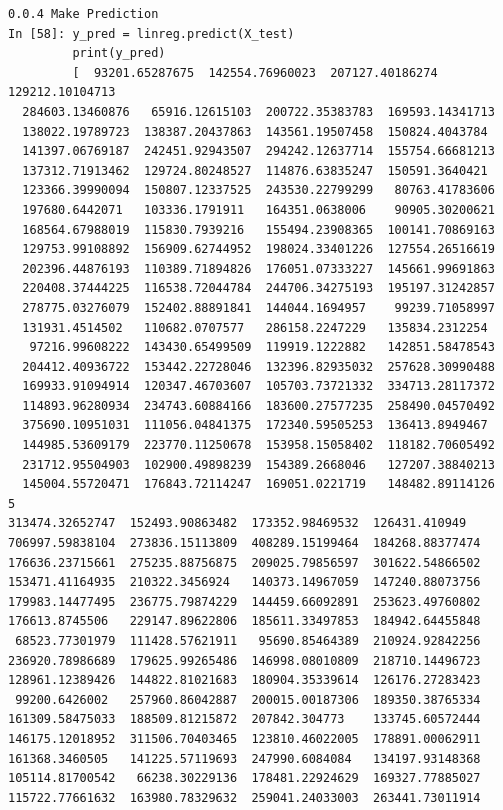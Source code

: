 \documentclass[sigconf]{acmart}
\begin{document}
\begin{lstlisting}
0.0.4 Make Prediction
In [58]: y_pred = linreg.predict(X_test)
         print(y_pred)
         [  93201.65287675  142554.76960023  207127.40186274  129212.10104713
  284603.13460876   65916.12615103  200722.35383783  169593.14341713
  138022.19789723  138387.20437863  143561.19507458  150824.4043784
  141397.06769187  242451.92943507  294242.12637714  155754.66681213
  137312.71913462  129724.80248527  114876.63835247  150591.3640421
  123366.39990094  150807.12337525  243530.22799299   80763.41783606
  197680.6442071   103336.1791911   164351.0638006    90905.30200621
  168564.67988019  115830.7939216   155494.23908365  100141.70869163
  129753.99108892  156909.62744952  198024.33401226  127554.26516619
  202396.44876193  110389.71894826  176051.07333227  145661.99691863
  220408.37444225  116538.72044784  244706.34275193  195197.31242857
  278775.03276079  152402.88891841  144044.1694957    99239.71058997
  131931.4514502   110682.0707577   286158.2247229   135834.2312254
   97216.99608222  143430.65499509  119919.1222882   142851.58478543
  204412.40936722  153442.22728046  132396.82935032  257628.30990488
  169933.91094914  120347.46703607  105703.73721332  334713.28117372
  114893.96280934  234743.60884166  183600.27577235  258490.04570492
  375690.10951031  111056.04841375  172340.59505253  136413.8949467
  144985.53609179  223770.11250678  153958.15058402  118182.70605492
  231712.95504903  102900.49898239  154389.2668046   127207.38840213
  145004.55720471  176843.72114247  169051.0221719   148482.89114126
5
313474.32652747  152493.90863482  173352.98469532  126431.410949
706997.59838104  273836.15113809  408289.15199464  184268.88377474
176636.23715661  275235.88756875  209025.79856597  301622.54866502
153471.41164935  210322.3456924   140373.14967059  147240.88073756
179983.14477495  236775.79874229  144459.66092891  253623.49760802
176613.8745506   229147.89622806  185611.33497853  184942.64455848
 68523.77301979  111428.57621911   95690.85464389  210924.92842256
236920.78986689  179625.99265486  146998.08010809  218710.14496723
128961.12389426  144822.81021683  180904.35339614  126176.27283423
 99200.6426002   257960.86042887  200015.00187306  189350.38765334
161309.58475033  188509.81215872  207842.304773    133745.60572444
146175.12018952  311506.70403465  123810.46022005  178891.00062911
161368.3460505   141225.57119693  247990.6084084   134197.93148368
105114.81700542   66238.30229136  178481.22924629  169327.77885027
115722.77661632  163980.78329632  259041.24033003  263441.73011914

\end{lstlisting}
\end{document}
